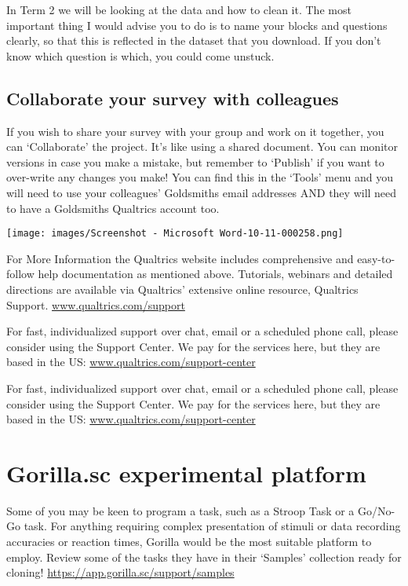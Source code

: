 \documentclass[
  letterpaper,
  DIV=11,
  numbers=noendperiod]{scrartcl}
\begin{document}
In Term 2 we will be looking at the data and how to clean it. The most
important thing I would advise you to do is to name your blocks and
questions clearly, so that this is reflected in the dataset that you
download. If you don't know which question is which, you could come
unstuck.

\subsection{Collaborate your survey with
colleagues}\label{collaborate-your-survey-with-colleagues}

If you wish to share your survey with your group and work on it
together, you can `Collaborate' the project. It's like using a shared
document. You can monitor versions in case you make a mistake, but
remember to `Publish' if you want to over-write any changes you make!
You can find this in the `Tools' menu and you will need to use your
colleagues' Goldsmiths email addresses AND they will need to have a
Goldsmiths Qualtrics account too.

\texttt{[image: images/Screenshot - Microsoft Word-10-11-000258.png]}

For More Information the Qualtrics website includes comprehensive and
easy-to-follow help documentation as mentioned above. Tutorials,
webinars and detailed directions are available via Qualtrics' extensive
online resource, Qualtrics Support. \url{www.qualtrics.com/support}

For fast, individualized support over chat, email or a scheduled phone
call, please consider using the Support Center. We pay for the services
here, but they are based in the US:
\url{www.qualtrics.com/support-center}

For fast, individualized support over chat, email or a scheduled phone
call, please consider using the Support Center. We pay for the services
here, but they are based in the US:
\url{www.qualtrics.com/support-center}

\section{\texorpdfstring{\textbf{Gorilla.sc experimental
platform}}{Gorilla.sc experimental platform}}\label{gorilla.sc-experimental-platform}

Some of you may be keen to program a task, such as a Stroop Task or a
Go/No-Go task. For anything requiring complex presentation of stimuli or
data recording accuracies or reaction times, Gorilla would be the most
suitable platform to employ. Review some of the tasks they have in their
`Samples' collection ready for cloning!
\url{https://app.gorilla.sc/support/samples}
\end{document}
